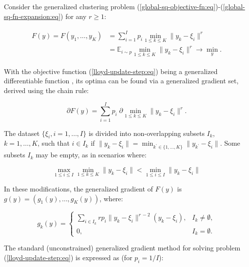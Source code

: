 Consider the generalized clustering problem (\ref{global-sq-objective-fn:eq})-(\ref{global-sq-fn-expansion:eq}) for any $r\geq 1$:

\begin{eqnarray}
    \label{lloyd-update-step:eq}
    \begin{aligned}
        F(y) = F(y_1, \ldots, y_K) &= \sum_{i=1}^I p_i \min_{1 \leq k \leq K} \| y_k - \xi_i \|^r \\
        &= \mathbb{E}_{i \sim p} \min_{1 \leq k \leq K} \| y_k - \xi_i \|^r \rightarrow \min_y. 
    \end{aligned}
\end{eqnarray}

With the objective function (\ref{lloyd-update-step:eq}) being a generalized differentiable function \cite{Norkin_1986}, its optima can be found via a generalized gradient set, derived using the chain rule:

\begin{equation}
    \label{lloyd-grad-set:eq}
    \partial F(y) = \sum_{i=1}^I p_i \; \partial \min_{1 \leq k \leq K} \| y_k - \xi_i \|^r. 
\end{equation}

The dataset $\{ \xi_i, i = 1, \ldots, I \}$ is divided into non-overlapping subsets $I_k$, $k = 1, \ldots, K$, such that $i \in I_k$ if $\| y_k - \xi_i \| = \min_{k^\prime \in \{ 1, \ldots, K \}} \| y_{k^\prime} - \xi_i \|$. Some subsets $I_k$ may be empty, as in scenarios where:

\begin{equation}
    \label{lloyd-empty-set-cond:eq}
    \max_{1 \leq i \leq I} \min_{1 \leq k \leq K} \|y_k - \xi_i\| < \min_{1 \leq i \leq I} \|y_k - \xi_i\|
\end{equation}

In these modifications, the generalized gradient of $F(y)$ is $g(y) = (g_1(y), \ldots, g_K(y))$, where:

\begin{equation}
    \label{lloyd-gen-grad-component:eq}
    g_k(y) = \begin{cases}
        \sum_{i \in I_k} r p_i \|y_{k} - \xi_i\|^{r\,-2}(y_{k} - \xi_i), & I_k \neq \emptyset, \\
        0, & I_k = \emptyset. 
    \end{cases}
\end{equation}

The standard (unconstrained) generalized gradient method for solving problem (\ref{lloyd-update-step:eq}) is expressed as (for $p_i = 1/I$):

